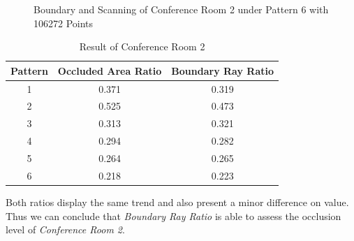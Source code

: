 \documentclass[11pt, a4paper,oneside,chapterprefix=false]{scrbook}
\begin{document}
\begin{figure}[H]
    \centering
      \label{fig:conf2 b 6} \hfill
     \label{fig:conf2 s 6}
    \caption{Boundary and Scanning of Conference Room 2 under Pattern 6 with 106272 Points}
    \label{fig:conf2 6}
\end{figure}

\begin{table}[H]
    \centering
    \begin{tabular}{|c|c|c|}
        \hline
        \textbf{Pattern} & \textbf{Occluded Area Ratio} & \textbf{Boundary Ray Ratio} \\
        \hline
        1 & 0.371 & 0.319 \\
        2 & 0.525 & 0.473 \\
        3 & 0.313 & 0.321 \\
        4 & 0.294 & 0.282 \\
		5 & 0.264 & 0.265 \\
		6 & 0.218 & 0.223 \\
        \hline
    \end{tabular}
    \caption{Result of Conference Room 2}
    \label{tab:result of conference room 2}
\end{table}

Both ratios display the same trend and also present a minor difference on value. Thus we can conclude that \emph{Boundary Ray Ratio} is able to assess the occlusion level of \emph{Conference Room 2}.
\end{document}
